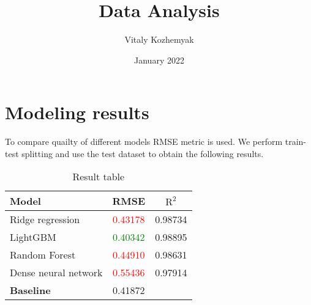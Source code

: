 \documentclass[11pt]{article}
\title{Data Analysis}
\author{Vitaly Kozhemyak}
\date{January 2022}
\begin{document}
\maketitle

\section{Modeling results}
To compare quailty of different models RMSE metric is used. We perform train-test splitting and use the test dataset to obtain the following results.
\begin{table}[H]
\centering
\begin{tabular}{|p{4cm}|c|c|} 
\hline
\bfseries Model & \bfseries RMSE & \bfseries $\text{R}^2$  \\
\hline\hline
Ridge regression & \textcolor{red}{0.43178} & 0.98734 \\
\hline
LightGBM & \textcolor{Green}{0.40342} & 0.98895 \\
\hline
Random Forest & \textcolor{red}{0.44910} & 0.98631 \\
\hline
Dense neural network & \textcolor{red}{0.55436} & 0.97914 \\
\hline\hline
\bfseries Baseline & 0.41872 & \\
\hline
\end{tabular}
\caption{Result table}
\end{table}
\end{document}

